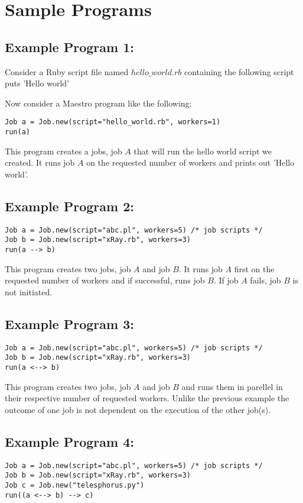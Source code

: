 \section{Sample Programs}
\label{sect:samples}
\subsection*{Example Program 1:}
Consider a Ruby script file named $hello\_world.rb$ containing the following script
puts 'Hello world'

Now consider a Maestro program like the following:
\begin{lstlisting}
Job a = Job.new(script="hello_world.rb", workers=1)
run(a)
\end{lstlisting}

This program creates a jobs, job $A$ that will run the hello world script we created. 
It runs job $A$ on the requested number of workers and prints out 'Hello world'.
\\

\subsection*{Example Program 2:}
\begin{lstlisting}
Job a = Job.new(script="abc.pl", workers=5) /* job scripts */
Job b = Job.new(script="xRay.rb", workers=3)
run(a --> b)
\end{lstlisting}

This program creates two jobs, job $A$ and job $B$. It runs job $A$ first on the requested number of workers
and if successful, runs job $B$. If job $A$ fails, job $B$ is not initiated.
\\

\subsection*{Example Program 3:}
\begin{lstlisting}
Job a = Job.new(script="abc.pl", workers=5) /* job scripts */
Job b = Job.new(script="xRay.rb", workers=3)
run(a <--> b)
\end{lstlisting}

This program creates two jobs, job $A$ and job $B$ and runs them in parellel in their respective number of requested workers.
Unlike the previous example the outcome of one job is not dependent on the execution of the other job(s).
\\

\subsection*{Example Program 4:}
\begin{lstlisting}
Job a = Job.new(script="abc.pl", workers=5) /* job scripts */
Job b = Job.new(script="xRay.rb", workers=3)
Job c = Job.new("telesphorus.py")
run((a <--> b) --> c)
\end{lstlisting}

